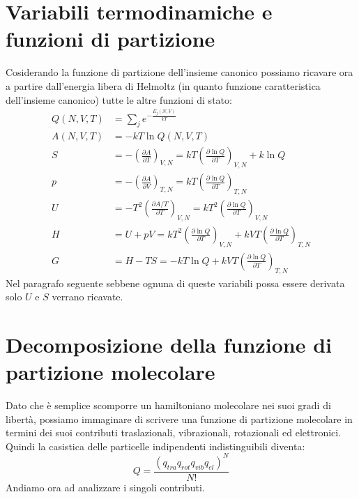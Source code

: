 \documentclass[oneside]{amsbook}
\numberwithin{section}{chapter}
\numberwithin{equation}{section}
\numberwithin{figure}{section}
\begin{document}
\section{Variabili termodinamiche e funzioni di partizione}
Cosiderando la funzione di partizione dell'insieme canonico possiamo ricavare ora a partire dall'energia libera di Helmoltz (in quanto funzione caratteristica dell'insieme canonico) tutte le altre funzioni di stato:
\begin{equation}
\begin{aligned}
Q(N,V,T)&=\sum_je^{-\frac{E_j(N,V)}{kT}}\\
A(N,V,T)&=-kT\ln Q(N,V,T)\\
S&=-\left(\frac{\partial A}{\partial T}\right)_{V,N}=kT\left(\frac{\partial\ln Q}{\partial T}\right)_{V,N}+k\ln Q\\
p&=-\left(\frac{\partial A}{\partial V}\right)_{T,N}=kT\left(\frac{\partial\ln Q}{\partial T}\right)_{T,N}\\
U&=-T^2\left(\frac{\partial A/T}{\partial T}\right)_{V,N}=kT^2\left(\frac{\partial\ln Q}{\partial T}\right)_{V,N}\\
H&=U+pV=kT^2\left(\frac{\partial\ln Q}{\partial T}\right)_{V,N}+kVT\left(\frac{\partial\ln Q}{\partial T}\right)_{T,N}\\
G&=H-TS=-kT\ln Q+kVT\left(\frac{\partial\ln Q}{\partial T}\right)_{T,N}
\end{aligned}
\end{equation}
Nel paragrafo seguente sebbene ognuna di queste variabili possa essere derivata solo $U$ e $S$ verrano ricavate.
\section{Decomposizione della funzione di partizione molecolare}
Dato che è semplice scomporre un hamiltoniano molecolare nei suoi gradi di libertà, possiamo immaginare di scrivere una funzione di partizione molecolare in termini dei suoi contributi traslazionali, vibrazionali, rotazionali ed elettronici. Quindi la casistica delle particelle indipendenti indistinguibili diventa:
\begin{equation}
Q=\frac{(q_{tra}q_{rot}q_{vib}q_{el})^N}{N!}
\end{equation}
Andiamo ora ad analizzare i singoli contributi.
\end{document}
